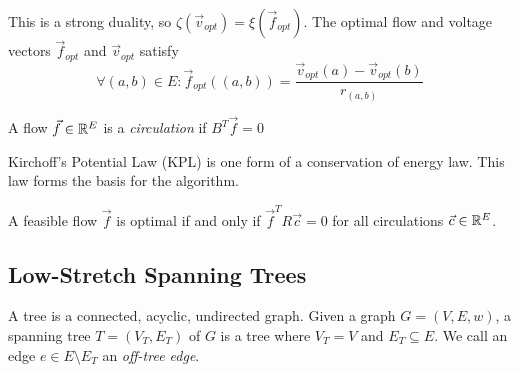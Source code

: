This is a strong duality, so $\zeta(\vec v_{opt}) = \xi(\vec f_{opt})$. The optimal flow and voltage vectors $\vec f_{opt}$ and $\vec v_{opt}$ satisfy 
$$
\forall (a,b) \in E: \vec f _{opt} ((a,b)) = \frac{\vec v_{opt}(a) - \vec v_{opt}(b)}{r_{(a,b)}}
$$

\begin{definition}[Circulation]
    A flow $\vec f \in \mathbb R^E$ is a \textit{circulation} if $B^T\vec f = 0 $
\end{definition}

Kirchoff's Potential Law (KPL) is one form of a conservation of energy law. This law forms the basis for the algorithm. 

\begin{lemma}[KPL]
A feasible flow $\vec f$ is optimal if and only if $\vec f^T R \vec c  = 0$ for all circulations $\vec c \in \mathbb R^E$. 
\end{lemma}

\subsection{Low-Stretch Spanning Trees}

A tree is a connected, acyclic, undirected graph. Given a graph $G = (V,E,w)$, a spanning tree $T = (V_T,E_T)$ of $G$ is a tree where $V_T = V$ and $E_T \subseteq E$. We call an edge $e \in E \setminus E_T$ an \textit{off-tree edge}. 

